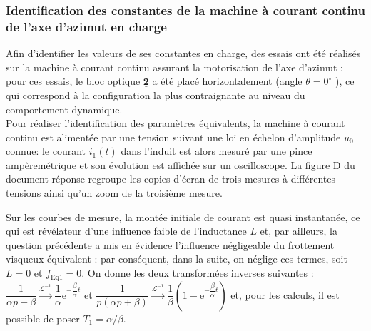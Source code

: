 \subsubsection{Identification des constantes de la machine à courant continu de l'axe d'azimut en charge}
Afin d'identifier les valeurs de ses constantes en charge, des essais ont été réalisés sur la machine à courant continu assurant la motorisation de l'axe d'azimut : pour ces essais, le bloc optique $\underline{\mathbf{2}}$ a été placé horizontalement (angle $\theta=0^{\circ}$ ), ce qui correspond à la configuration la plus contraignante au niveau du comportement dynamique.\\
Pour réaliser l'identification des paramètres équivalents, la machine à courant continu est alimentée par une tension suivant une loi en échelon d'amplitude $u_{0}$ connue: le courant $i_{1}(t)$ dans l'induit est alors mesuré par une pince ampèremétrique et son évolution est affichée sur un oscilloscope. La figure D du document réponse regroupe les copies d'écran de trois mesures à différentes tensions ainsi qu'un zoom de la troisième mesure.\\

\ifprof
\begin{corrige}
\end{corrige}
\else
\fi


Sur les courbes de mesure, la montée initiale de courant est quasi instantanée, ce qui est révélateur d'une influence faible de l'inductance $L$ et, par ailleurs, la question précédente a mis en évidence l'influence négligeable du frottement visqueux équivalent : par conséquent, dans la suite, on néglige ces termes, soit $L=0$ et $f_{\mathrm{Eq} 1}=0$. On donne les deux transformées inverses suivantes : $\dfrac{1}{\alpha p+\beta} \xrightarrow{\mathcal{L}^{-1}} \dfrac{1}{\alpha} \mathrm{e}^{-\dfrac{\beta}{\alpha} t}$ et $\dfrac{1}{p(\alpha p+\beta)} \xrightarrow{\mathcal{L}^{-1}} \dfrac{1}{\beta}\left(1-\mathrm{e}^{-\dfrac{\beta}{\alpha} t}\right)$ et, pour les calculs, il est possible de poser $T_{1}=\alpha / \beta$.

\ifprof
\begin{corrige}
\end{corrige}
\else
\fi


